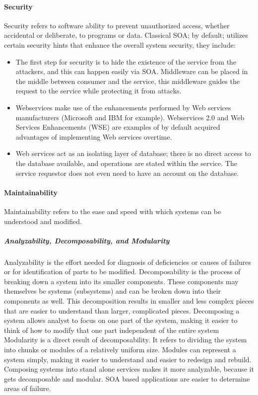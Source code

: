 \documentclass[12pt,a4paper,final,twoside,onecolumn,titlepage]{book}
\begin{document}
\paragraph{Security}
Security refers to software ability to prevent unauthorized access, whether accidental or deliberate, to programs or data. Classical \gls{SOA}; by default; utilizes certain security hints that enhance the overall system security, they include:
\begin{itemize}
\item The first step for security is to hide the existence of the service from the attackers, and this can happen easily via SOA. Middleware can be placed in the middle between consumer and the service, this middleware guides the request to the service while protecting it from attacks.
\item Webservices make use of the enhancements performed by Web services manufacturers (Microsoft and IBM for example). Webservices 2.0 and Web Services Enhancements (WSE) are examples of by default acquired advantages of implementing Web services overtime.
\item Web services act as an isolating layer of database; there is no direct access to the database available, and operations are stated within the service. The service requestor does not even need to have an account on the database. 
\end{itemize}

\paragraph{Maintainability}
Maintainability refers to the ease and speed with which systems can be understood and modified.

\subparagraph{Analyzability, Decomposability, and Modularity}
Analyzability is the effort needed for diagnosis of deficiencies or causes of failures or for identification of parts to be modified. Decomposability is the process of breaking down a system into its smaller components. These components may themselves be systems (subsystems) and can be broken down into their components as well. This decomposition results in smaller and less complex pieces that are easier to understand than larger, complicated pieces. Decomposing a system allows analyst to focus on one part of the system, making it easier to think of how to modify that one part independent of the entire system Modularity is a direct result of decomposability. It refers to dividing the system into chunks or modules of a relatively uniform size. Modules can represent a system simply, making it easier to understand and easier to redesign and rebuild. Composing systems into stand alone services makes it more analyzable, because it gets decomposable and modular. SOA based applications are easier to determine areas of failure.
\end{document}
